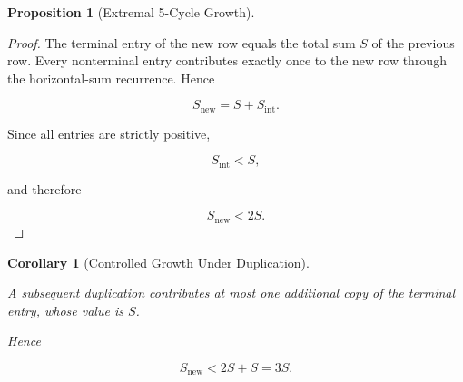 \documentclass[12pt, oneside]{article}
\numberwithin{equation}{section}
\theoremstyle{definition}
\newtheorem{proposition}{Proposition}[section]
\theoremstyle{plain}
\newtheorem{lemma}[theorem]{Lemma}
\newtheorem{corollary}[theorem]{Corollary}
\theoremstyle{remark}
\begin{document}
\begin{proposition}[Extremal 5-Cycle Growth]
\begin{proof}
The terminal entry of the new row equals the total sum $S$ of the previous row.
Every nonterminal entry contributes exactly once to the new row through the
horizontal-sum recurrence. Hence

\[
S_{\mathrm{new}}
=
S+S_{\mathrm{int}}.
\]

Since all entries are strictly positive,

\[
S_{\mathrm{int}}<S,
\]

and therefore

\[
S_{\mathrm{new}}<2S.
\]

\end{proof}

\begin{corollary}[Controlled Growth Under Duplication]
\label{lem:controlled-growth-under-duplication}

A subsequent duplication contributes at most one additional copy of the
terminal entry, whose value is $S$.

Hence

\[
S_{\mathrm{new}}
<
2S+S
=
3S.
\]

\end{corollary}










\end{proposition}
\end{document}
